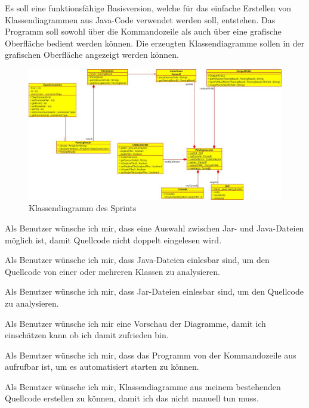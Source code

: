 Es soll eine funktionsfähige Basisversion, welche für das einfache Erstellen von Klassendiagrammen aus Java-Code verwendet werden soll, entstehen. Das Programm soll sowohl über die Kommandozeile als auch über eine grafische Oberfläche bedient werden können. Die erzeugten Klassendiagramme sollen in der grafischen Oberfläche angezeigt werden können.

\begin{figure}[hbtp]
\centering
\includegraphics[scale=0.5]{Bilder/classDiagrammSprint1}
\caption{Klassendiagramm des Sprints}
\end{figure}
\nsecend

Als Benutzer wünsche ich mir, dass eine Auswahl zwischen Jar- und Java-Dateien möglich ist, damit Quellcode nicht doppelt eingelesen wird.
\nsecend

Als Benutzer wünsche ich mir, dass Java-Dateien einlesbar sind, um den Quellcode von einer oder mehreren Klassen zu analysieren.
\nsecend

Als Benutzer wünsche ich mir, dass Jar-Dateien einlesbar sind, um den Quellcode zu analysieren.
\nsecend
\nsecend

Als Benutzer wünsche ich mir eine Vorschau der Diagramme, damit ich einschätzen kann ob ich damit zufrieden bin.
\nsecend

Als Benutzer wünsche ich mir, dass das Programm von der Kommandozeile aus aufrufbar ist, um es automatisiert starten zu können.
\nsecend

Als Benutzer wünsche ich mir, Klassendiagramme aus meinem bestehenden Quellcode erstellen zu können, damit ich das nicht manuell tun muss.
\nsecend

